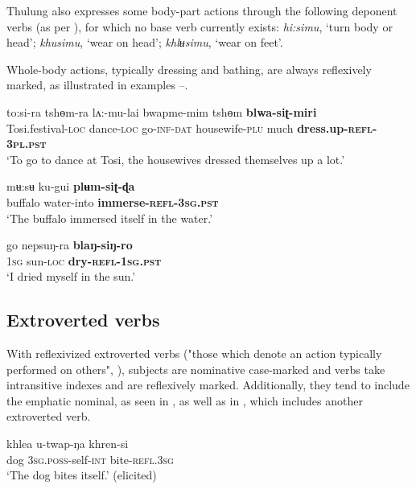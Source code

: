 \documentclass[output=paper]{langscibook}
\begin{document}
Thulung also expresses some body-part actions through the following deponent verbs (as per \citealt[22]{Kemmer1993}), for which no base verb currently exists: \textit{hi:simu}, ‘turn body or head'; \textit{khusimu}, ‘wear on head'; \textit{khlʉsimu}, ‘wear on feet'.

Whole-body actions, typically dressing and bathing, are always reflexively marked, as illustrated in examples --.

\ea%
    \label{ex:Lahaussois:26}
    \gll to:si-ra tshɵm-ra lʌ:-mu-lai bwapme-mim tshɵm \textbf{blwa-siʈ-miri}\\
        Tosi.festival-\textsc{loc} dance-\textsc{loc} go-\textsc{inf-dat} housewife-\textsc{plu} much \textbf{dress.up-\textsc{refl-3pl.pst}} \\
    \glt ‘To go to dance at Tosi, the housewives dressed themselves up a lot.'
    \z

\ea%
    \label{ex:Lahaussois:27}
    \gll mʉ:sʉ ku-gui \textbf{plʉm-siʈ-ɖa}\\
        buffalo water-into \textbf{immerse-\textsc{refl-3sg.pst}}\\
    \glt ‘The buffalo immersed itself in the water.'
    \z

\ea%
    \label{ex:Lahaussois:28}
    \gll go nepsuŋ-ra \textbf{blaŋ-siŋ-ro}\\
    1\textsc{sg} sun-\textsc{loc} \textbf{dry-\textsc{refl-1sg.pst}}\\
    \glt ‘I dried myself in the sun.'
    \z


\subsection{Extroverted verbs}
\label{sec:Lahaussois:4.2}

With reflexivized extroverted verbs ("those which denote an action typically performed on others", \citealt[73]{Haiman1998}), subjects are nominative case-marked and verbs take intransitive indexes and are reflexively marked.  Additionally, they tend to include the emphatic nominal, as seen in , as well as in , which includes another extroverted verb.

\ea%
    \label{ex:Lahaussois:29}
    \gll khlea u-twap-ŋa khren-si\\
        dog \textsc{3sg.poss}{}-self-\textsc{int}   bite-\textsc{refl.3sg}\\
    \glt ‘The dog bites itself.' (elicited)
    \z
\end{document}
